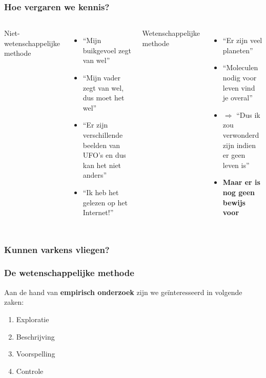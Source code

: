 \documentclass{beamer}
\begin{document}
\begin{frame}
  \frametitle{Hoe vergaren we kennis?}

  \begin{columns}[c]

  Niet-wetenschappelijke methode
    \begin{itemize}
    \item ``Mijn buikgevoel zegt van wel''
    \item ``Mijn vader zegt van wel, dus moet het wel''
    \item ``Er zijn verschillende beelden van UFO's en dus kan het niet anders''
    \item ``Ik heb het gelezen op het Internet!''
    \end{itemize}

  \pause

  Wetenschappelijke methode
    \begin{itemize}
    \item ``Er zijn veel planeten''
    \item ``Moleculen nodig voor leven vind je overal''
    \item $\Rightarrow$ ``Dus ik zou verwonderd zijn indien er geen leven is''
    \item \textbf{Maar er is nog geen bewijs voor}
    \end{itemize}

  \end{columns}
\end{frame}

\begin{frame}
  \frametitle{Kunnen varkens vliegen?}
\end{frame}

\begin{frame}
  \frametitle{De wetenschappelijke methode}

  Aan de hand van \textbf{empirisch onderzoek} zijn we geïnteresseerd in volgende zaken:

  \begin{enumerate}
    \item Exploratie
    \item Beschrijving
    \item Voorspelling
    \item Controle
  \end{enumerate}
\end{frame}
\end{document}
